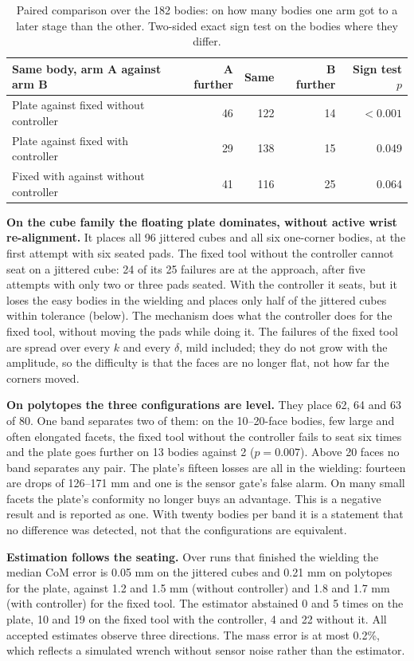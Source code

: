 \begin{table}[htbp]\centering\small
\begin{tabular}{@{}lrrrr@{}}\toprule
Same body, arm A against arm B & A further & Same & B further & Sign test $p$\\
\midrule
Plate against fixed without controller & 46 & 122 & 14 & $<0.001$\\
Plate against fixed with controller & 29 & 138 & 15 & 0.049\\
Fixed with against without controller & 41 & 116 & 25 & 0.064\\
\bottomrule\end{tabular}
\caption{Paired comparison over the 182 bodies: on how many bodies one arm got to a later stage than the other. Two-sided exact sign test on the bodies where they differ.}
\label{tab:geo-paired}
\end{table}

\textbf{On the cube family the floating plate dominates, without active wrist re-alignment.} It places all 96 jittered cubes and all six one-corner bodies, at the first attempt with six seated pads. The fixed tool without the controller cannot seat on a jittered cube: 24 of its 25 failures are at the approach, after five attempts with only two or three pads seated. With the controller it seats, but it loses the easy bodies in the wielding and places only half of the jittered cubes within tolerance (below). The mechanism does what the controller does for the fixed tool, without moving the pads while doing it. The failures of the fixed tool are spread over every $k$ and every $\delta$, mild included; they do not grow with the amplitude, so the difficulty is that the faces are no longer flat, not how far the corners moved.

\textbf{On polytopes the three configurations are level.} They place 62, 64 and 63 of 80. One band separates two of them: on the 10--20-face bodies, few large and often elongated facets, the fixed tool without the controller fails to seat six times and the plate goes further on 13 bodies against 2 ($p=0.007$). Above 20 faces no band separates any pair. The plate's fifteen losses are all in the wielding: fourteen are drops of 126--171 mm and one is the sensor gate's false alarm. On many small facets the plate's conformity no longer buys an advantage. This is a negative result and is reported as one. With twenty bodies per band it is a statement that no difference was detected, not that the configurations are equivalent.

\textbf{Estimation follows the seating.} Over runs that finished the wielding the median CoM error is 0.05 mm on the jittered cubes and 0.21 mm on polytopes for the plate, against 1.2 and 1.5 mm (without controller) and 1.8 and 1.7 mm (with controller) for the fixed tool. The estimator abstained 0 and 5 times on the plate, 10 and 19 on the fixed tool with the controller, 4 and 22 without it. All accepted estimates observe three directions. The mass error is at most 0.2\%, which reflects a simulated wrench without sensor noise rather than the estimator.

